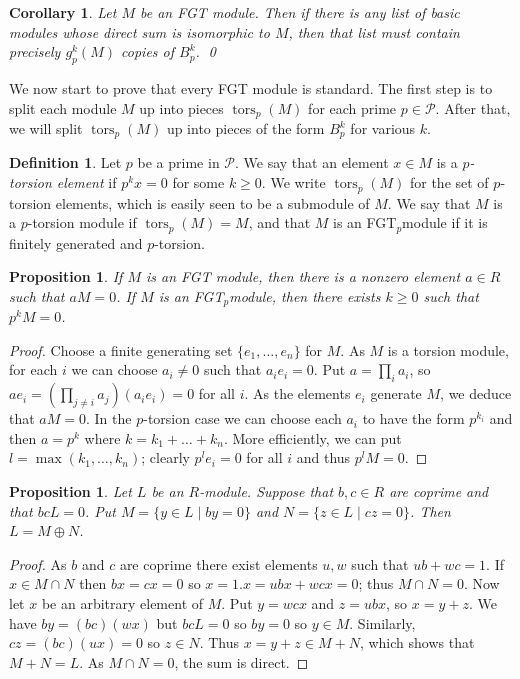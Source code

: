 \documentclass{amsart}
\newcommand{\tors}      {\operatorname{tors}}
\newcommand{\st}        {\;|\;}
\newcommand{\CP}        {{\mathcal{P}}}
\newcommand{\op}        {\oplus}
\newcommand{\FGTp}      {FGT${}_p$}
\renewcommand{\:}{\colon}
\newtheorem{proposition}[theorem]{Proposition}
\newtheorem{corollary}[theorem]{Corollary}
\theoremstyle{definition}
\newtheorem{definition}[theorem]{Definition}
\begin{document}
\begin{corollary}
 Let $M$ be an FGT module.  Then if there is any list of basic modules
 whose direct sum is isomorphic to $M$, then that list must contain
 precisely $g_p^k(M)$ copies of $B_p^k$. \qed
\end{corollary}

We now start to prove that every FGT module is standard.  The first
step is to split each module $M$ up into pieces $\tors_p(M)$ for each
prime $p\in\CP$.  After that, we will split $\tors_p(M)$ up into
pieces of the form $B_p^k$ for various $k$.

\begin{definition}
 Let $p$ be a prime in $\CP$.  We say that an element $x\in M$ is a
 \emph{$p$-torsion element} if $p^kx=0$ for some $k\geq 0$.  We write
 $\tors_p(M)$ for the set of $p$-torsion elements, which is easily
 seen to be a submodule of $M$.  We say that $M$ is a $p$-torsion
 module if $\tors_p(M)=M$, and that $M$ is an \FGTp module if it is
 finitely generated and $p$-torsion.
\end{definition}

\begin{proposition}\label{prop-totally-tors}
 If $M$ is an FGT module, then there is a nonzero element $a\in R$
 such that $aM=0$.  If $M$ is an \FGTp module, then there exists
 $k\geq 0$ such that $p^kM=0$.
\end{proposition}
\begin{proof}
 Choose a finite generating set $\{e_1,\ldots,e_n\}$ for $M$.  As $M$
 is a torsion module, for each $i$ we can choose $a_i\neq 0$ such that
 $a_ie_i=0$.  Put $a=\prod_ia_i$, so
 $ae_i=(\prod_{j\neq i}a_j)(a_ie_i)=0$ for all $i$.  As the elements
 $e_i$ generate $M$, we deduce that $aM=0$.  In the $p$-torsion case
 we can choose each $a_i$ to have the form $p^{k_i}$ and then $a=p^k$
 where $k=k_1+\ldots+k_n$.  More efficiently, we can put
 $l=\max(k_1,\ldots,k_n)$; clearly $p^le_i=0$ for all $i$ and thus
 $p^lM=0$.
\end{proof}

\begin{proposition}
 Let $L$ be an $R$-module.  Suppose that $b,c\in R$ are coprime and
 that $bcL=0$.  Put $M=\{y\in L\st by=0\}$ and
 $N=\{z\in L\st cz=0\}$.  Then $L=M\op N$.
\end{proposition}
\begin{proof}
 As $b$ and $c$ are coprime there exist elements $u,w$ such that
 $ub+wc=1$.  If $x\in M\cap N$ then $bx=cx=0$ so $x=1.x=ubx+wcx=0$;
 thus $M\cap N=0$.  Now let $x$ be an arbitrary element of $M$.  Put
 $y=wcx$ and $z=ubx$, so $x=y+z$.  We have $by=(bc)(wx)$ but $bcL=0$
 so $by=0$ so $y\in M$.  Similarly, $cz=(bc)(ux)=0$ so $z\in N$.  Thus
 $x=y+z\in M+N$, which shows that $M+N=L$.  As $M\cap N=0$, the sum is
 direct. 
\end{proof}
\end{document}
